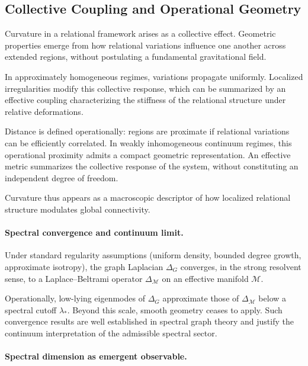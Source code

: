 \subsection{Collective Coupling and Operational Geometry}
  \label{subsec:collective-coupling-operational-geometry}

  Curvature in a relational framework arises as a collective effect.
  Geometric properties emerge from how relational variations influence one
  another across extended regions, without postulating a fundamental
  gravitational field.

  In approximately homogeneous regimes, variations propagate uniformly.
  Localized irregularities modify this collective response,
  which can be summarized by an effective coupling characterizing
  the stiffness of the relational structure under relative deformations.

  Distance is defined operationally:
  regions are proximate if relational variations can be efficiently correlated.
  In weakly inhomogeneous continuum regimes,
  this operational proximity admits a compact geometric representation.
  An effective metric summarizes the collective response of the system,
  without constituting an independent degree of freedom.

  Curvature thus appears as a macroscopic descriptor of how localized
  relational structure modulates global connectivity.

  \paragraph{Spectral convergence and continuum limit.}

    Under standard regularity assumptions
    (uniform density, bounded degree growth, approximate isotropy),
    the graph Laplacian $\Delta_G$ converges,
    in the strong resolvent sense,
    to a Laplace--Beltrami operator $\Delta_{\mathcal M}$
    on an effective manifold $\mathcal M$.

    Operationally, low-lying eigenmodes of $\Delta_G$
    approximate those of $\Delta_{\mathcal M}$
    below a spectral cutoff $\lambda_*$.
    Beyond this scale, smooth geometry ceases to apply.
    Such convergence results are well established in spectral graph theory
    and justify the continuum interpretation of the admissible spectral sector.

  \paragraph{Spectral dimension as emergent observable.}

